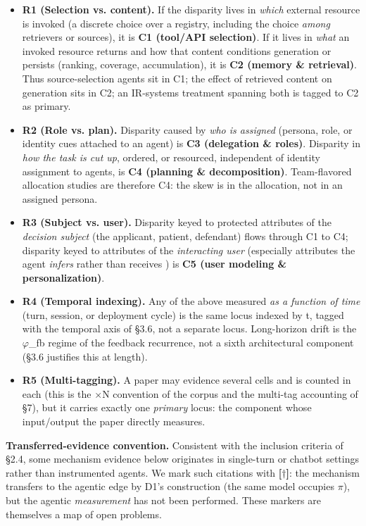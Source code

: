 \documentclass[10pt]{article}
\begin{document}
\begin{itemize}
\item \textbf{R1 (Selection vs. content).} If the disparity lives in \emph{which} external resource is invoked (a discrete choice over a registry, including the choice \emph{among} retrievers or sources), it is \textbf{C1 (tool/API selection)}. If it lives in \emph{what} an invoked resource returns and how that content conditions generation or persists (ranking, coverage, accumulation), it is \textbf{C2 (memory \& retrieval)}. Thus source-selection agents \cite{singh2025biasb} sit in C1; the effect of retrieved content on generation \cite{wu2024rag,hu2024free} sits in C2; an IR-systems treatment spanning both \cite{dai2024bias,dai2025trustworthy} is tagged to C2 as primary.
\item \textbf{R2 (Role vs. plan).} Disparity caused by \emph{who is assigned} (persona, role, or identity cues attached to an agent) is \textbf{C3 (delegation \& roles)}. Disparity in \emph{how the task is cut up}, ordered, or resourced, independent of identity assignment to agents, is \textbf{C4 (planning \& decomposition)}. Team-flavored allocation studies \cite{parziale2026once} are therefore C4: the skew is in the allocation, not in an assigned persona.
\item \textbf{R3 (Subject vs. user).} Disparity keyed to protected attributes of the \emph{decision subject} (the applicant, patient, defendant) flows through C1 to C4; disparity keyed to attributes of the \emph{interacting user} (especially attributes the agent \emph{infers} rather than receives \cite{staab2023memorization}) is \textbf{C5 (user modeling \& personalization)}.
\item \textbf{R4 (Temporal indexing).} Any of the above measured \emph{as a function of time} (turn, session, or deployment cycle) is the same locus indexed by t, tagged with the temporal axis of \S{}3.6, not a separate locus. Long-horizon drift is the $\varphi$\_fb regime of the feedback recurrence, not a sixth architectural component (\S{}3.6 justifies this at length).
\item \textbf{R5 (Multi-tagging).} A paper may evidence several cells and is counted in each (this is the $\times$N convention of the corpus and the multi-tag accounting of \S{}7), but it carries exactly one \emph{primary} locus: the component whose input/output the paper directly measures.
\end{itemize}

\textbf{Transferred-evidence convention.} Consistent with the inclusion criteria of \S{}2.4, some mechanism evidence below originates in single-turn or chatbot settings rather than instrumented agents. We mark such citations with \textbf{[$\dagger$]}: the mechanism transfers to the agentic edge by D1's construction (the same model occupies $\pi$), but the agentic \emph{measurement} has not been performed. These markers are themselves a map of open problems.
\end{document}
